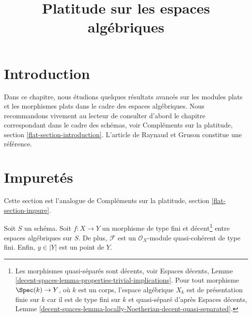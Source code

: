 

%


\title{Platitude sur les espaces algébriques}

\maketitle

\label{section-phantom}

\tableofcontents



\section{Introduction}
\label{section-introduction}

\noindent
Dans ce chapitre, nous étudions quelques résultats avancés sur les modules plats et
les morphismes plats dans le cadre des espaces algébriques. Nous recommandons vivement
au lecteur de consulter d'abord le chapitre correspondant
dans le cadre des schémas, voir
Compléments sur la platitude, section \ref{flat-section-introduction}.
L'article \cite{GruRay} de Raynaud et Gruson constitue une référence.







\section{Impuretés}
\label{section-impure}

\noindent
Cette section est l'analogue de
Compléments sur la platitude, section \ref{flat-section-impure}.

\begin{situation}
\label{situation-pre-pure}
Soit $S$ un schéma. Soit $f : X \to Y$ un morphisme
de type fini et décent\footnote{Les morphismes quasi-séparés sont décents, voir
Espaces décents, Lemme
\ref{decent-spaces-lemma-properties-trivial-implications}.
Pour tout morphisme $\Spec(k) \to Y$, où $k$ est un corps,
l'espace algébrique $X_k$ est de présentation finie sur $k$
car il est de type fini sur $k$ et quasi-séparé d'après
Espaces décents, Lemme
\ref{decent-spaces-lemma-locally-Noetherian-decent-quasi-separated}.}
entre espaces algébriques sur $S$. De plus, $\mathcal{F}$ est un $\mathcal{O}_X$-module
quasi-cohérent de type fini. Enfin, $y \in |Y|$ est un point de $Y$.
\end{situation}

